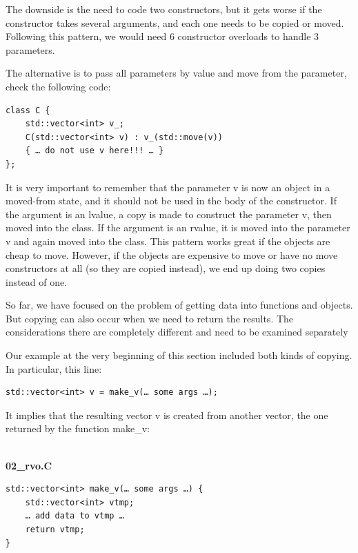 The downside is the need to code two constructors, but it gets worse if the constructor takes several arguments, and each one needs to be copied or moved. Following this pattern, we would need 6 constructor overloads to handle 3 parameters.

The alternative is to pass all parameters by value and move from the parameter, check the following code:

\begin{lstlisting}[style=styleCXX]
class C {
	std::vector<int> v_;
	C(std::vector<int> v) : v_(std::move(v)) 
	{ … do not use v here!!! … }
};
\end{lstlisting}

It is very important to remember that the parameter v is now an object in a moved-from state, and it should not be used in the body of the constructor. If the argument is an lvalue, a copy is made to construct the parameter v, then moved into the class. If the argument is an rvalue, it is moved into the parameter v and again moved into the class. This pattern works great if the objects are cheap to move. However, if the objects are expensive to move or have no move constructors at all (so they are copied instead), we end up doing two copies instead of one. 

So far, we have focused on the problem of getting data into functions and objects. But copying can also occur when we need to return the results. The considerations there are completely different and need to be examined separately


Our example at the very beginning of this section included both kinds of copying. In particular, this line:

\begin{lstlisting}[style=styleCXX]
std::vector<int> v = make_v(… some args …);
\end{lstlisting}

It implies that the resulting vector v is created from another vector, the one returned by the function make\_v:

\hspace*{\fill} \\ %
\noindent
\textbf{02\_rvo.C}
\begin{lstlisting}[style=styleCXX]
std::vector<int> make_v(… some args …) {
	std::vector<int> vtmp;
	… add data to vtmp …
	return vtmp;
}
\end{lstlisting}

